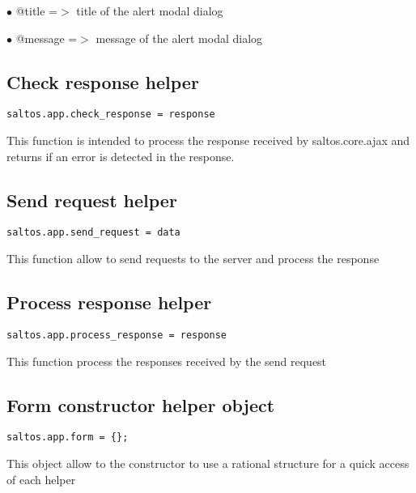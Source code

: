 \documentclass[a4paper]{book}
\begin{document}
\begin{compactitem}
\item[\color{myblue}$\bullet$] @title   =$>$ title of the alert modal dialog
\item[\color{myblue}$\bullet$] @message =$>$ message of the alert modal dialog
\end{compactitem}

\hypertarget{toc372}{}
\subsection{Check response helper}

\begin{lstlisting}
saltos.app.check_response = response
\end{lstlisting}

This function is intended to process the response received by saltos.core.ajax and returns
if an error is detected in the response.

\hypertarget{toc373}{}
\subsection{Send request helper}

\begin{lstlisting}
saltos.app.send_request = data
\end{lstlisting}

This function allow to send requests to the server and process the response

\hypertarget{toc374}{}
\subsection{Process response helper}

\begin{lstlisting}
saltos.app.process_response = response
\end{lstlisting}

This function process the responses received by the send request

\hypertarget{toc375}{}
\subsection{Form constructor helper object}

\begin{lstlisting}
saltos.app.form = {};
\end{lstlisting}

This object allow to the constructor to use a rational structure for a quick access of each helper
\end{document}
